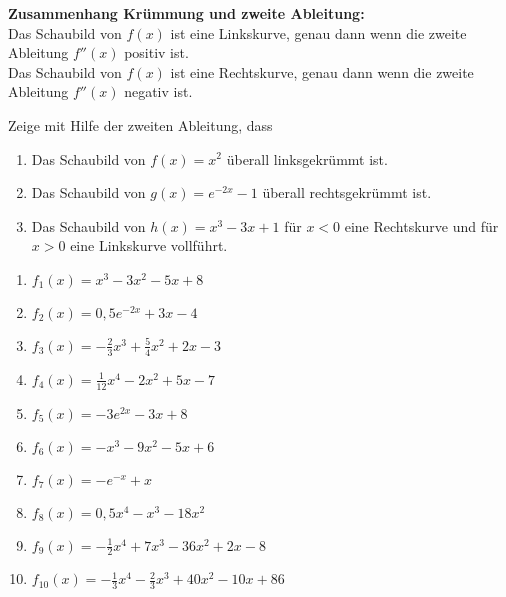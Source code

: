 \begin{tcolorbox}
	\textbf{Zusammenhang Krümmung und zweite Ableitung:}\\
	\textcolor{loestc}{Das Schaubild von \(f(x)\) ist eine Linkskurve, genau dann wenn die zweite Ableitung \(f''(x)\) positiv ist.\\
		Das Schaubild von \(f(x)\) ist eine Rechtskurve, genau dann wenn die zweite Ableitung \(f''(x)\) negativ ist.\\}
\end{tcolorbox}
Zeige mit Hilfe der zweiten Ableitung, dass
\begin{enumerate}
	\item Das Schaubild von \(f(x)=x^2\) überall linksgekrümmt ist.
	\item Das Schaubild von \(g(x)=e^{-2x}-1\) überall rechtsgekrümmt ist.
	\item Das Schaubild von \(h(x)=x^3-3x+1\) für \(x<0\) eine Rechtskurve und für \(x>0\) eine Linkskurve vollführt.
\end{enumerate}
\newpage
\begin{Exercise}[title={\raggedright Gib mit Hilfe der zweiten Ableitung die Intervalle an, in denen das Schaubild eine Links- bzw. Rechtskurve hat.}, label=kruemmungA1]
	\begin{enumerate}[label=\alph*)]
		\item \(f_1(x)=x^3-3x^2-5x+8\)
		\item \(f_2(x)=0,5e^{-2x}+3x-4\)
		\item \(f_3(x)=-\frac{2}{3}x^3+\frac{5}{4}x^2+2x-3\)
		\item \(f_4(x)=\frac{1}{12}x^4-2x^2+5x-7\)
		\item \(f_5(x)=-3e^{2x}-3x+8\)
		\item \(f_6(x)=-x^3-9x^2-5x+6\)
		\item \(f_7(x)=-e^{-x}+x\)
		\item \(f_8(x)=0,5x^4-x^3-18x^2\)
		\item \(f_9(x)=-\frac{1}{2}x^4+7x^3-36x^2+2x-8\)
		\item \(f_{10}(x)=-\frac{1}{3}x^4-\frac{2}{3}x^3+40x^2-10x+86\)
	\end{enumerate}
\end{Exercise}
